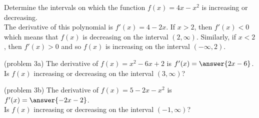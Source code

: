 \documentclass[handout]{ximera}
\begin{document}
\begin{example}[example 3]
Determine the intervals on which the function $f(x) = 4x - x^2$ is increasing or decreasing.\\
The derivative of this polynomial is $f'(x) = 4 -  2x$. If $x > 2$, then $f'(x) <0$ which means that $f(x)$ is decreasing on the interval $(2, \infty)$.
Similarly, if $x<2$, then $f'(x) >0$ and so $f(x)$ is increasing on the interval $(-\infty, 2)$.
\begin{image}
\end{image}

\end{example}

\begin{problem}(problem 3a)
The derivative of $f(x)=x^2 - 6x + 2$ is $f'(x) = \answer{2x-6}$.\\
Is $f(x)$ increasing or decreasing on the interval $(3, \infty)$?
\begin{multipleChoice}
\end{multipleChoice}
\end{problem}


\begin{problem}(problem 3b)
The derivative of $f(x)=5 - 2x - x^2$ is $f'(x) = \answer{-2x-2}$.\\
Is $f(x)$ increasing or decreasing on the interval $(-1, \infty)$?
\begin{multipleChoice}
\end{multipleChoice}
\end{problem}
\end{document}
